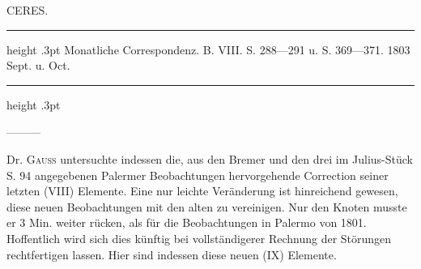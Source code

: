 \par\medskip
{}
\begin{center}\large CERES.\end{center}
\begin{center}\parbox{.94\linewidth}{\centering\footnotesize\frenchspacing
\hrule height .3pt\relax\vspace{2.5pt}
Monatliche Correspondenz. B. VIII. S. 288—291 u. S. 369—371. 1803 Sept. u. Oct.\par
\vspace{2.5pt}\hrule height .3pt\relax
}\end{center}
\par\indent ---\enspace---\enspace---\par\nobreak
Dr. \textsc{Gauss} untersuchte indessen die, aus den Bremer und den drei im Julius-Stück S. 94 angegebenen Palermer Beobachtungen hervorgehende Correction seiner letzten (VIII) Elemente. Eine nur leichte Veränderung ist hinreichend gewesen, diese neuen Beobachtungen mit den alten zu vereinigen. Nur den Knoten musste er 3 Min. weiter rücken, als für die Beobachtungen in Palermo von 1801. Hoffentlich wird sich dies künftig bei vollständigerer Rechnung der Störungen rechtfertigen lassen. Hier sind indessen diese neuen (IX) Elemente.

